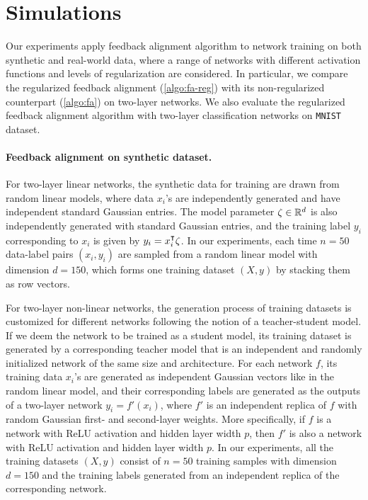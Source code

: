 \section{Simulations}

Our experiments apply feedback alignment algorithm to network training on both synthetic and real-world data, where a range of networks with different activation functions and levels of regularization are considered. In particular, we compare the regularized feedback alignment (\cref{algo:fa-reg}) with its non-regularized counterpart (\cref{algo:fa}) on two-layer networks. We also evaluate the regularized feedback alignment algorithm with two-layer classification networks on \texttt{MNIST} dataset.

\paragraph{Feedback alignment on synthetic dataset.}

For two-layer linear networks, the synthetic data for training are drawn from random linear models, where data $x_i$'s are independently generated and have independent standard Gaussian entries. The model parameter $\zeta\in{\mathbb{R}^{d}}$ is also independently generated with standard Gaussian entries, and the training label $y_i$ corresponding to $x_i$ is given by $y_i = x_i\transpose \zeta$. In our experiments, each time $n = 50$ data-label pairs $(x_i,y_i)$ are sampled from a random linear model with dimension $d = 150$, which forms one training dataset $(X,y)$ by stacking them as row vectors.

For two-layer non-linear networks, the generation process of training datasets is customized for different networks following the notion of a teacher-student model. If we deem the network to be trained as a student model, its training dataset is generated by a corresponding teacher model that is an independent and randomly initialized network of the same size and architecture. For each network $f$, its training data $x_i$'s are generated as independent Gaussian vectors like in the random linear model, and their corresponding labels are generated as the outputs of a two-layer network $y_i = f'(x_i)$, where $f'$ is an independent replica of $f$ with random Gaussian first- and second-layer weights. More specifically, if $f$ is a network with ReLU activation and hidden layer width $p$, then $f'$ is also a network with ReLU activation and hidden layer width $p$. In our experiments, all the training datasets $(X,y)$ consist of $n = 50$ training samples with dimension $d = 150$ and the training labels generated from an independent replica of the corresponding network.


